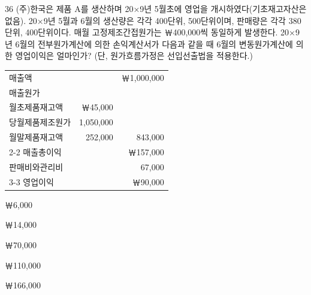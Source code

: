 \begin{question}{36}
(주)한국은 제품 A를 생산하며 20×9년 5월초에 영업을 개시하였다(기초재고자산은 없음). 20×9년 5월과 6월의 생산량은 각각 400단위, 500단위이며, 판매량은 각각 380단위, 400단위이다. 매월 고정제조간접원가는 ￦400,000씩 동일하게 발생한다. 20×9년 6월의 전부원가계산에 의한 손익계산서가 다음과 같을 때 6월의 변동원가계산에 의한 영업이익은 얼마인가? (단, 원가흐름가정은 선입선출법을 적용한다.)

{\small\centering
\begin{tabular}{@{}l r r@{}}
\hline
매출액 & & ￦1,000,000 \\
매출원가 & & \\
\hspace{1em}월초제품재고액 & ￦45,000 & \\
\hspace{1em}당월제품제조원가 & 1,050,000 & \\
\hspace{1em}월말제품재고액 & 252,000 & 843,000 \\
\cline{2-2}\cline{3-3}
매출총이익 & & ￦157,000 \\
\hspace{1em}판매비와관리비 & & 67,000 \\
\cline{3-3}
영업이익 & & ￦90,000 \\
\hline
\end{tabular}\par}
\begin{choices}
  \item ￦6,000
  \item ￦14,000
  \item ￦70,000
  \item ￦110,000
  \item ￦166,000
\end{choices}
\end{question}
